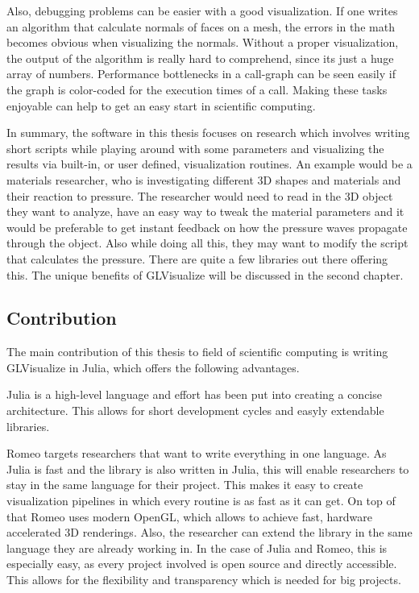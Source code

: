 Also, debugging problems can be easier with a good visualization. 
If one writes an algorithm that calculate normals of faces on a mesh, the errors in the math becomes obvious when visualizing the normals. Without a proper visualization, the output of the algorithm is really hard to comprehend, since its just a huge array of numbers.
Performance bottlenecks in a call-graph can be seen easily if the graph is color-coded for the execution times of a call. 
Making these tasks enjoyable can help to get an easy start in scientific computing.

In summary, the software in this thesis focuses on research which involves writing short scripts while playing around with some parameters and visualizing the results via built-in, or user defined, visualization routines.
An example would be a materials researcher, who is investigating different 3D shapes and materials and their reaction to pressure.
The researcher would need to read in the 3D object they want to analyze, have an easy way to tweak the material parameters and it would be preferable to get instant feedback on how the pressure waves propagate through the object. Also while doing all this, they may want to modify the script that calculates the pressure.
There are quite a few libraries out there offering this. 
The unique benefits of GLVisualize will be discussed in the second chapter.


\subsection{Contribution}

The main contribution of this thesis to field of scientific computing is writing GLVisualize in Julia, which offers the following advantages.

Julia is a high-level language and effort has been put into creating a concise architecture. 
This allows for short development cycles and easyly extendable libraries.

Romeo targets researchers that want to write everything in one language.
As Julia is fast and the library is also written in Julia, this will enable researchers to stay in the same language for their project. 
This makes it easy to create visualization pipelines in which every routine is as fast as it can get. 
On top of that Romeo uses modern \ac{OpenGL}, which allows to achieve fast, hardware accelerated 3D renderings.
Also, the researcher can extend the library in the same language they are already working in. 
In the case of Julia and Romeo, this is especially easy, as every project involved is open source and directly accessible.
This allows for the flexibility and transparency which is needed for big projects.

